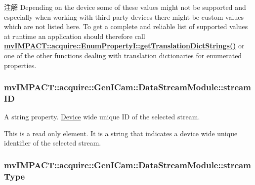 \begin{DoxyNote}{注解}
Depending on the device some of these values might not be supported and especially when working with third party devices there might be custom values which are not listed here. To get a complete and reliable list of supported values at runtime an application should therefore call {\bfseries \hyperlink{classmv_i_m_p_a_c_t_1_1acquire_1_1_enum_property_i_a0ba6ccbf5ee69784d5d0b537924d26b6}{mv\+I\+M\+P\+A\+C\+T\+::acquire\+::\+Enum\+Property\+I\+::get\+Translation\+Dict\+Strings()}} or one of the other functions dealing with translation dictionaries for enumerated properties. 
\end{DoxyNote}
\hypertarget{classmv_i_m_p_a_c_t_1_1acquire_1_1_gen_i_cam_1_1_data_stream_module_aaab634dd91e5fac930fa661918d8b0f8}{
\subsubsection[{stream\+I\+D}]{ mv\+I\+M\+P\+A\+C\+T\+::acquire\+::\+Gen\+I\+Cam\+::\+Data\+Stream\+Module\+::stream\+I\+D}}\label{classmv_i_m_p_a_c_t_1_1acquire_1_1_gen_i_cam_1_1_data_stream_module_aaab634dd91e5fac930fa661918d8b0f8}


A string property. \hyperlink{classmv_i_m_p_a_c_t_1_1acquire_1_1_device}{Device} wide unique I\+D of the selected stream. 

This is a read only element. It is a string that indicates a device wide unique identifier of the selected stream. \hypertarget{classmv_i_m_p_a_c_t_1_1acquire_1_1_gen_i_cam_1_1_data_stream_module_ada03b278d8c08fd81cdabcb52ef55de5}{
\subsubsection[{stream\+Type}]{ mv\+I\+M\+P\+A\+C\+T\+::acquire\+::\+Gen\+I\+Cam\+::\+Data\+Stream\+Module\+::stream\+Type}}\label{classmv_i_m_p_a_c_t_1_1acquire_1_1_gen_i_cam_1_1_data_stream_module_ada03b278d8c08fd81cdabcb52ef55de5}


